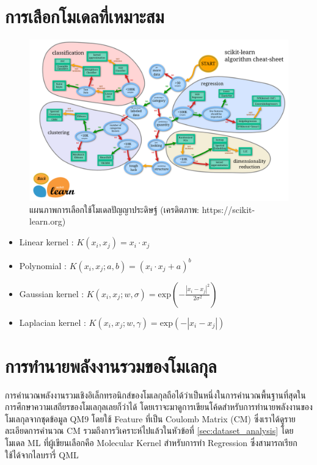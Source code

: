 \section{การเลือกโมเดลที่เหมาะสม}
\label{sec:choose_ml_model}

\begin{figure}[H]
    \centering
    \includegraphics[width=1.3\linewidth,angle=90]{fig/ml_map.png}
    \caption{แผนภาพการเลือกใช้โมเดลปัญญาประดิษฐ์ (เครดิตภาพ: https://scikit-learn.org)}
    \label{fig:ml_map}
\end{figure}

\begin{itemize}
    \item Linear kernel : $K(x_i, x_j) = x_i \cdot x_j$
    \item Polynomial : $K(x_i, x_j; a, b) = (x_i \cdot x_j + a)^b$
    \item Gaussian kernel : $K(x_i, x_j; w, \sigma) = \mathrm{exp}\left(-\frac{|x_i-x_j|^2}{2\sigma^2}\right)$
    \item Laplacian kernel : $K(x_i, x_j; w, \gamma) = \mathrm{exp}\left(-{|x_i-x_j|}\right)$
\end{itemize}

\section{การทำนายพลังงานรวมของโมเลกุล}
\label{sec:pred_tot_ener}

การคำนวณพลังงานรวมเชิงอิเล็กทรอนิกส์ของโมเลกุลถือได้ว่าเป็นหนึ่งในการคำนวณพื้นฐานที่สุดในการศึกษาความเสถียรของโมเลกุลเลยก็ว่าได้
โดยเราจะมาดูการเขียนโค้ดสำหรับการทำนายพลังงานของโมเลกุลจากชุดข้อมูล QM9 โดยใช้ Feature ที่เป็น Coulomb Matrix (CM) 
ซึ่งเราได้ดูรายละเอียดการคำนวณ CM รวมถึงการวิเคราะห์ไปแล้วในหัวข้อที่ \ref{sec:dataset_analysis} โดยโมเดล ML ที่ผู้เขียนเลือกคือ
Molecular Kernel สำหรับการทำ Regression ซึ่งสามารถเรียกใช้ได้จากไลบรารี่ QML

